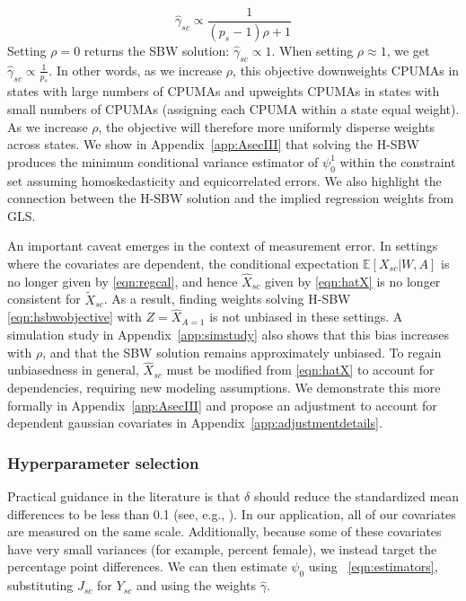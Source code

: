 \documentclass[aoas]{imsart}
\theoremstyle{plain}
\theoremstyle{remark}
\begin{document}
\begin{equation}\label{eqn:sbwsol}
\hat{\gamma}_{sc} \propto \frac{1}{(p_s - 1)\rho + 1}
\end{equation}
Setting $\rho = 0$ returns the SBW solution: $\hat{\gamma}_{sc} \propto 1$. When setting $\rho \approx 1$, we get $\hat{\gamma}_{sc} \propto \frac{1}{p_s}$. In other words, as we increase $\rho$, this objective downweights CPUMAs in states with large numbers of CPUMAs and upweights CPUMAs in states with small numbers of CPUMAs (assigning each CPUMA within a state equal weight). As we increase $\rho$, the objective will therefore more uniformly disperse weights across states. We show in Appendix~\ref{app:AsecIII} that solving the H-SBW produces the minimum conditional variance estimator of $\psi_0^1$ within the constraint set assuming homoskedasticity and equicorrelated errors. We also highlight the connection between the H-SBW solution and the implied regression weights from GLS.

An important caveat emerges in the context of measurement error. In settings where the covariates are dependent, the conditional expectation $\mathbb{E}[X_{sc}|W,A]$ is no longer given by \eqref{eqn:regcal}, and hence $\hat{X}_{sc}$ given by \eqref{eqn:hatX} is no longer consistent for $\tilde{X}_{sc}$. As a result, finding weights solving H-SBW \eqref{eqn:hsbwobjective} with $Z = \hat{X}_{A=1}$ is not unbiased in these settings. A simulation study in Appendix~\ref{app:simstudy} also shows that this bias increases with $\rho$, and that the SBW solution remains approximately unbiased. To regain unbiasedness in general, $\hat{X}_{sc}$ must be modified from \eqref{eqn:hatX} to account for dependencies, requiring new modeling assumptions. We demonstrate this more formally in Appendix~\ref{app:AsecIII} and propose an adjustment to account for dependent gaussian covariates in Appendix~\ref{app:adjustmentdetails}.

\subsubsection{Hyperparameter selection} \label{ssec:delta}

Practical guidance in the literature is that $\delta$ should reduce the standardized mean differences to be less than 0.1 (see, e.g., \cite{zhang2019balance}). In our application, all of our covariates are measured on the same scale. Additionally, because some of these covariates have very small variances (for example, percent female), we instead target the percentage point differences. We can then estimate $\psi_0$ using ~\eqref{eqn:estimators}, substituting $J_{sc}$ for $Y_{sc}$ and using the weights $\hat{\gamma}$.
\end{document}
